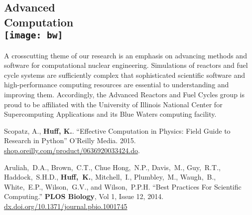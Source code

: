 \documentclass[margin,line]{resume}
\begin{document}
\begin{resume}
      \vspace{2mm}
    \section{\mysidestyle Advanced\\ Computation\\ \vspace{16mm}
        \texttt{[image: bw]}}
 A crosscutting theme of our research is an emphasis on advancing methods and 
        software for computational nuclear engineering. Simulations of reactors 
        and fuel cycle systems are sufficiently complex that sophisticated 
        scientific software and high-performance computing resources are 
        essential to understanding and improving them. Accordingly, the 
        Advanced Reactors and Fuel Cycles group is proud to be affiliated with 
        the University of Illinois National Center for Supercomputing 
        Applications and its Blue Waters computing facility.

        \vspace{2mm}

      \begin{bibenum}
      \item Scopatz, A., \textbf{Huff, K.}. ``Effective Computation in
      Physics: Field Guide to Research in Python'' O'Reilly Media. 2015.
      \url{shop.oreilly.com/product/0636920033424.do}.
       \item Aruliah,~D.A., Brown,~C.T., Chue Hong,~N.P., Davis,~M., Guy,~R.T.,
          Haddock,~S.H.D., \textbf{Huff,~K.}, Mitchell,~I., Plumbley,~M., Waugh,~B.,
          White,~E.P., Wilson,~G.V., and Wilson,~P.P.H.  ``Best Practices For
          Scientific Computing.'' \textbf{PLOS Biology}, Vol 1, Issue 12,
          2014. \url{dx.doi.org/10.1371/journal.pbio.1001745}
      \end{bibenum}


\end{resume}
\end{document}
